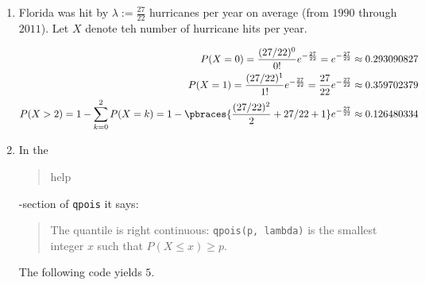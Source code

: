 \begin{solution}

\phantom{}

\begin{enumerate}[label = (\alph*)]

    \item Florida was hit by $\lambda := \frac{27}{22}$ hurricanes per year on average (from $1990$ through $2011$).
    Let $X$ denote teh number of hurricane hits per year.

    \begin{align}
        P(X = 0)
        =
        \frac{(27 / 22)^0}{0!} e^{-\frac{27}{22}}
        =
        e^{-\frac{27}{22}}
        \approx
        0.293090827 \\
        P(X = 1)
        =
        \frac{(27 / 22)^1}{1!} e^{-\frac{27}{22}}
        =
        \frac{27}{22} e^{-\frac{27}{22}}
        \approx
        0.359702379 \\
        P(X > 2)
        =
        1 - \sum_{k=0}^2 P(X = k)
        =
        1 - \pbraces
        {
            \frac{(27 / 22)^2}{2} + 27 / 22 + 1
        }
        e^{-\frac{27}{22}}
        \approx
        0.126480334
    \end{align}

    \item In the \blockquote{help}-section of \texttt{qpois} it says:
    \blockquote{The quantile is right continuous: \texttt{qpois(p, lambda)} is the smallest integer $x$ such that $P(X \leq x) \geq p$.}

    The following code yields $5$.

    

\end{enumerate}

\end{solution}

